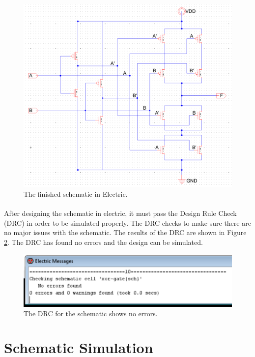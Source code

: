 \documentclass{article}
\begin{document}
  \begin{figure}[H]
    \centering
    \includegraphics[width=\linewidth, frame]{screenshots/schematic.png}
    \caption{The finished schematic in Electric.}
    \label{fig:schem}
  \end{figure}

  \paragraph{}
  After designing the schematic in electric, it must pass the Design Rule Check (DRC) in order to be simulated properly. The DRC checks to make sure there are no major issues with the schematic. The results of the DRC are shown in Figure \ref{fig:sch-drc}. The DRC has found no errors and the design can be simulated.

  \begin{figure}[H]
    \centering
    \includegraphics[width=0.9\linewidth, frame]{screenshots/schematic-drc.png}
    \caption{The DRC for the schematic shows no errors.}
    \label{fig:sch-drc}
  \end{figure}

\section{Schematic Simulation}
\end{document}
